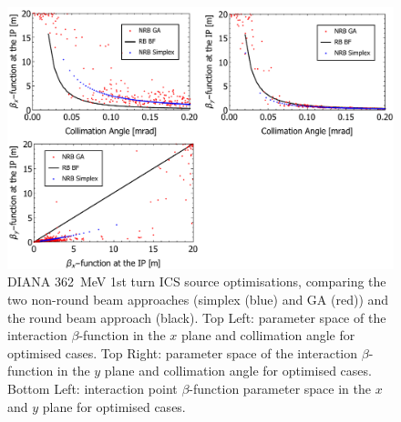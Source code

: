 \documentclass[../main.tex]{subfiles}
\begin{document}
\begin{figure}[!h]
\centering
\includegraphics[width=\textwidth]{Figures/DIANA_Inverse_Compton_Source_Design/DIANA362param.pdf}
\caption{DIANA 362~\si{\mega\electronvolt} 1st turn ICS source optimisations, comparing the two non-round beam approaches (simplex (blue) and GA (red)) and the round beam approach (black). Top Left: parameter space of the interaction $\beta$-function in the $x$ plane and collimation angle for optimised cases. Top Right: parameter space of the interaction $\beta$-function in the $y$ plane and collimation angle for optimised cases.  Bottom Left: interaction point $\beta$-function parameter space in the $x$ and $y$ plane for optimised cases. }
\label{fig:DIANA362_param}
\end{figure}
\end{document}
